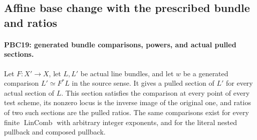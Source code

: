 \documentclass[11pt,a4paper]{article}
\numberwithin{equation}{section}
\theoremstyle{remark}\newtheorem{remark}[theorem]{Remark}
\begin{document}
\subsection{Affine base change with the prescribed bundle and ratios}

\paragraph{PBC19: generated bundle comparisons, powers, and actual pulled sections.}
\label{claim:PBC19}
Let $F:X'\to X$, let $L,L'$ be actual line bundles, and let
$w$ be a generated comparison $L'\simeq F^*L$ in the source
sense.  It gives a pulled section of $L'$ for every actual
section of $L$.  This section satisfies the comparison at
every point of every test scheme, its nonzero locus is the
inverse image of the original one, and ratios of two such
sections are the pulled ratios.
The same comparisons exist for every finite
$\operatorname{LinComb}$ with arbitrary integer exponents,
and for the literal nested pullback and composed pullback.
\end{document}

